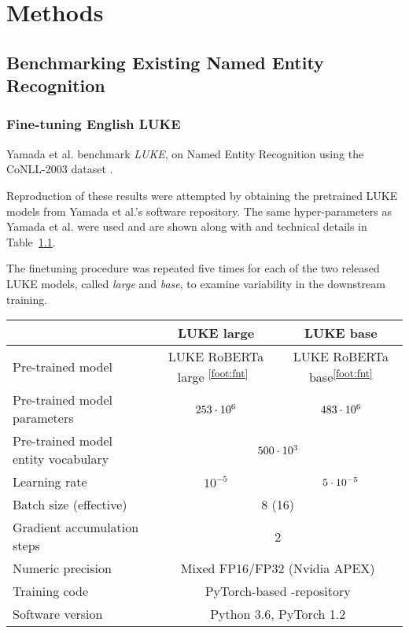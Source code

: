 \documentclass[main.tex]{subfiles}
\begin{document}
\chapter{Methods}

\section{Benchmarking Existing Named Entity Recognition}
\subsection{Fine-tuning English LUKE}
Yamada et al. benchmark \emph{LUKE}, on Named Entity Recognition using the CoNLL-2003 dataset \cite{yamada2020luke}.

Reproduction of these results were attempted by obtaining the pretrained LUKE models from Yamada et al.'s software repository.
The same hyper-parameters as Yamada et al. were used and are shown along with and technical details in Table~\ref{tab:params}.

The finetuning procedure was repeated five times for each of the two released LUKE models, called \emph{large} and \emph{base}, to examine variability in the downstream training.
\addtocounter{footnote}{1}
\begin{table}[H]
    \begin{tabular}{l|cc}
                                    & LUKE large & LUKE base\\\hline
        Pre-trained model
                                    & LUKE RoBERTa large \textsuperscript{\ref{foot:fnt}}\
                                                & LUKE RoBERTa base\textsuperscript{\ref{foot:fnt}}\\
        Pre-trained model parameters & $253\cdot10^{6}$ & $483\cdot10^{6}$\\
        Pre-trained model entity vocabulary & \multicolumn{2}{c}{$500\cdot10^{3}$}\\
        Learning rate               & $10^{-5}$ & $5\cdot10^{-5}$\\
        Batch size (effective)      & \multicolumn{2}{c}{8 (16)}\\
        Gradient accumulation steps & \multicolumn{2}{c}{2}\\
        Numeric precision           & \multicolumn{2}{c}{Mixed FP16/FP32 (Nvidia APEX)}\\
        Training code               & \multicolumn{2}{c}{PyTorch-based \code{luke}-repository \protect\footnotemark}\\
        Software version            & \multicolumn{2}{c}{Python 3.6, PyTorch 1.2}
    \end{tabular}
    \label{tab:params}
\end{table}
\end{document}
